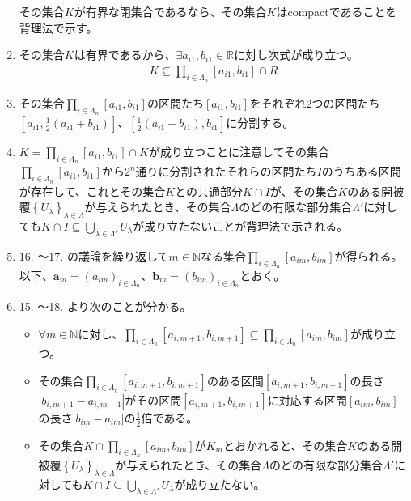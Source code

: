 \documentclass[dvipdfmx]{jsarticle}
\begin{document}
\begin{enumerate}
  その集合$K$が有界な閉集合であるなら、その集合$K$はcompactであることを背理法で示す。
\item
  その集合$K$は有界であるから、$\exists a_{i1},b_{i1} \in \mathbb{R}$に対し次式が成り立つ。
\begin{align*}
K \subseteq \prod_{i \in \varLambda_{n}} \left[ a_{i1},b_{i1} \right] \cap R
\end{align*}
\item
  その集合$\prod_{i \in \varLambda_{n}} \left[ a_{i1},b_{i1} \right]$の区間たち$\left[ a_{i1},b_{i1} \right]$をそれぞれ2つの区間たち$\left[ a_{i1},\frac{1}{2}\left( a_{i1} + b_{i1} \right) \right] 、\left[ \frac{1}{2}\left( a_{i1} + b_{i1} \right),b_{i1} \right]$に分割する。
\item
  $K = \prod_{i \in \varLambda_{n}} \left[ a_{i1},b_{i1} \right] \cap K$が成り立つことに注意してその集合$\prod_{i \in \varLambda_{n}} \left[ a_{i1},b_{i1} \right]$から$2^{n}$通りに分割されたそれらの区間たち$I$のうちある区間が存在して、これとその集合$K$との共通部分$K \cap I$が、その集合$K$のある開被覆$\left\{ U_{\lambda} \right\}_{\lambda \in \varLambda}$が与えられたとき、その集合$\varLambda$のどの有限な部分集合$\varLambda'$に対しても$K \cap I \subseteq \bigcup_{\lambda \in \varLambda'} U_{\lambda}$が成り立たないことが背理法で示される。
\item
  16. ～17. の議論を繰り返して$m \in \mathbb{N}$なる集合$\prod_{i \in \varLambda_{n}} \left[ a_{im},b_{im} \right]$が得られる。以下、$\mathbf{a}_{m} = \left( a_{im} \right)_{i \in \varLambda_{n}}$、$\mathbf{b}_{m} = \left( b_{im} \right)_{i \in \varLambda_{n}}$とおく。
\item
  15. ～18. より次のことが分かる。
\begin{itemize}
\item
  $\forall m \in \mathbb{N}$に対し、$\prod_{i \in \varLambda_{n}} \left[ a_{i,m + 1},b_{i,m + 1} \right] \subseteq \prod_{i \in \varLambda_{n}} \left[ a_{im},b_{im} \right]$が成り立つ。
\item
  その集合$\prod_{i \in \varLambda_{n}} \left[ a_{i,m + 1},b_{i,m + 1} \right]$のある区間$\left[ a_{i,m + 1},b_{i,m + 1} \right]$の長さ$\left| b_{i,m + 1} - a_{i,m + 1} \right|$がその区間$\left[ a_{i,m + 1},b_{i,m + 1} \right]$に対応する区間$\left[ a_{im},b_{im} \right]$の長さ$\left| b_{im} - a_{im} \right|$の$\frac{1}{2}$倍である。
\item
  その集合$K \cap \prod_{i \in \varLambda_{n}} \left[ a_{im},b_{im} \right]$が$K_{m}$とおかれると、その集合$K$のある開被覆$\left\{ U_{\lambda} \right\}_{\lambda \in \varLambda}$が与えられたとき、その集合$\varLambda$のどの有限な部分集合$\varLambda'$に対しても$K \cap I \subseteq \bigcup_{\lambda \in \varLambda'} U_{\lambda}$が成り立たない。

\end{itemize}
\end{enumerate}
\end{document}
